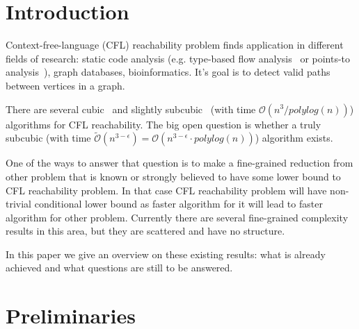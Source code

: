 \documentclass[acmsmall,review,nonacm]{acmart}\settopmatter{printfolios=true,printccs=false,printacmref=false}
\begin{document}
	
	
	
	\maketitle
	
	\section{Introduction}
	
	Context-free-language (CFL) reachability problem finds application in different fields of research: static code analysis (e.g. type-based flow analysis~\cite{10.1145/373243.360208} or points-to analysis~\cite{10.1145/1103845.1094817, 10.1145/1133255.1134027}), graph databases, bioinformatics. It's goal is to detect valid paths between vertices in a graph. 
	
	There are several cubic~\cite{10.1145/298514.298576, 10.1145/199448.199462} and slightly subcubic~\cite{10.1145/1328438.1328460} (with time $\mathcal{O}(n^{3} / polylog(n))$) algorithms for CFL reachability. The big open question is whether a truly subcubic (with time $\tilde{\mathcal{O}}(n^{3 - \epsilon}) = \mathcal{O}(n^{3 - \epsilon} \cdot polylog(n))$) algorithm exists. 
	
	One of the ways to answer that question is to make a fine-grained reduction from other problem that is known or strongly believed to have some lower bound to CFL reachability problem. In that case CFL reachability problem will have non-trivial conditional lower bound as faster algorithm for it will lead to faster algorithm for other problem. Currently there are several fine-grained complexity results in this area, but they are scattered and have no structure.
	
	In this paper we give an overview on these existing results: what is already achieved and what questions are still to be answered.
	
	\section{Preliminaries}
	
\end{document}

